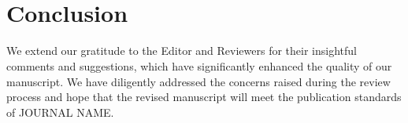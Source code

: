 \documentclass[preprint,review,12pt]{elsarticle}
\begin{document}

\\
\\
\section*{Conclusion}
We extend our gratitude to the Editor and Reviewers for their insightful comments and suggestions, which have significantly enhanced the quality of our manuscript. We have diligently addressed the concerns raised during the review process and hope that the revised manuscript will meet the publication standards of JOURNAL NAME.\\










% 

% 



\end{document}
